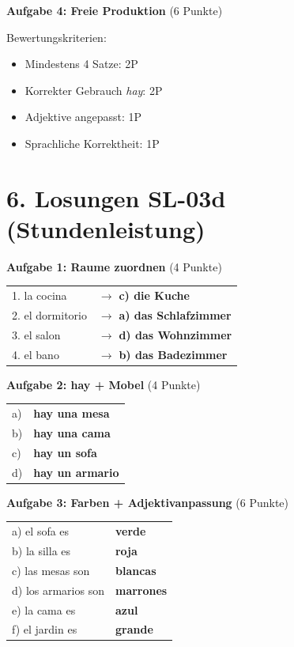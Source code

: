 \documentclass[11pt, a4paper]{article}
\newcommand{\loesung}[1]{\textcolor{loesung}{\textbf{#1}}}
\begin{document}
\vspace{1em}

\textbf{Aufgabe 4: Freie Produktion} (6 Punkte)

Bewertungskriterien:
\begin{itemize}
    \item Mindestens 4 Satze: 2P
    \item Korrekter Gebrauch \textit{hay}: 2P
    \item Adjektive angepasst: 1P
    \item Sprachliche Korrektheit: 1P
\end{itemize}


\section*{6. Losungen SL-03d (Stundenleistung)}

\textbf{Aufgabe 1: Raume zuordnen} (4 Punkte)
\begin{tabular}{ll}
1. la cocina & $\rightarrow$ \loesung{c) die Kuche} \\
2. el dormitorio & $\rightarrow$ \loesung{a) das Schlafzimmer} \\
3. el salon & $\rightarrow$ \loesung{d) das Wohnzimmer} \\
4. el bano & $\rightarrow$ \loesung{b) das Badezimmer} \\
\end{tabular}

\vspace{1em}

\textbf{Aufgabe 2: hay + Mobel} (4 Punkte)
\begin{tabular}{ll}
a) & \loesung{hay una mesa} \\
b) & \loesung{hay una cama} \\
c) & \loesung{hay un sofa} \\
d) & \loesung{hay un armario} \\
\end{tabular}

\vspace{1em}

\textbf{Aufgabe 3: Farben + Adjektivanpassung} (6 Punkte)
\begin{tabular}{ll}
a) el sofa es & \loesung{verde} \\
b) la silla es & \loesung{roja} \\
c) las mesas son & \loesung{blancas} \\
d) los armarios son & \loesung{marrones} \\
e) la cama es & \loesung{azul} \\
f) el jardin es & \loesung{grande} \\
\end{tabular}
\end{document}
